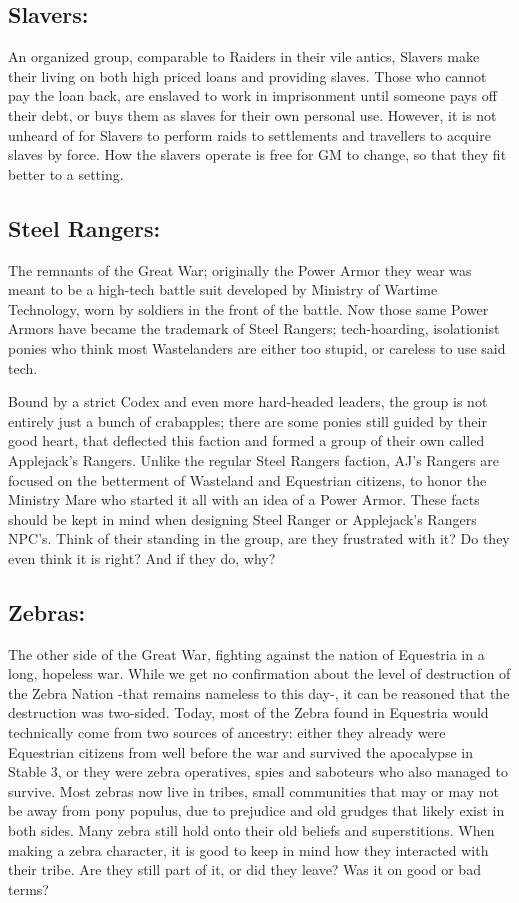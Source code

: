 \documentclass[11pt,a4paper,twocolumn]{book}
\begin{document}
    \subsection*{Slavers:}
    An organized group, comparable to Raiders in their vile antics, Slavers make their living on both high priced loans and providing slaves. Those who cannot pay the loan back, are enslaved to work in imprisonment until someone pays off their debt, or buys them as slaves for their own personal use. However, it is not unheard of for Slavers to perform raids to settlements and travellers to acquire slaves by force. How the slavers operate is free for GM to change, so that they fit better to a setting.
    
    \subsection*{Steel Rangers:}
    The remnants of the Great War; originally the Power Armor they wear was meant to be a high-tech battle suit developed by Ministry of Wartime Technology, worn by soldiers in the front of the battle. Now those same Power Armors have became the trademark of Steel Rangers; tech-hoarding, isolationist ponies who think most Wastelanders are either too stupid, or careless to use said tech. 
    
    Bound by a strict Codex and even more hard-headed leaders, the group is not entirely just a bunch of crabapples; there are some ponies still guided by their good heart, that deflected this faction and formed a group of their own called Applejack's Rangers. Unlike the regular Steel Rangers faction, AJ's Rangers are focused on the betterment of Wasteland and Equestrian citizens, to honor the Ministry Mare who started it all with an idea of a Power Armor. These facts should be kept in mind when designing Steel Ranger or Applejack's Rangers NPC's. Think of their standing in the group, are they frustrated with it? Do they even think it is right? And if they do, why?
    
    \subsection*{Zebras:}
    The other side of the Great War, fighting against the nation of Equestria in a long, hopeless war. While we get no confirmation about the level of destruction of the Zebra Nation -that remains nameless to this day-, it can be reasoned that the destruction was two-sided. Today, most of the Zebra found in Equestria would technically come from two sources of ancestry: either they already were Equestrian citizens from well before the war and survived the apocalypse in Stable 3, or they were zebra operatives, spies and saboteurs who also managed to survive. 
    Most zebras now live in tribes, small communities that may or may not be away from pony populus, due to prejudice and old grudges that likely exist in both sides. Many zebra still hold onto their old beliefs and superstitions. When making a zebra character, it is good to keep in mind how they interacted with their tribe. Are they still part of it, or did they leave? Was it on good or bad terms?
    
\end{document}
